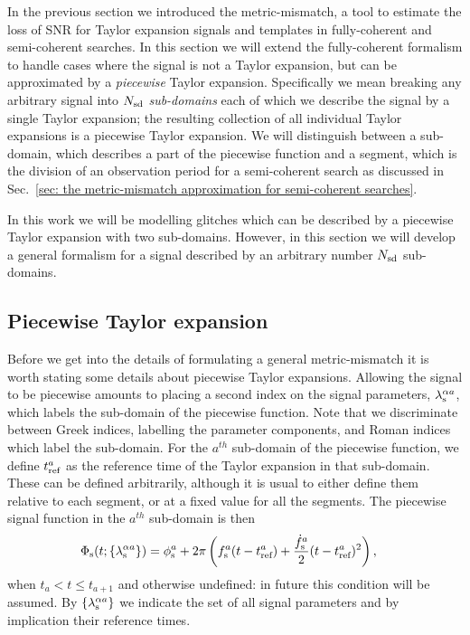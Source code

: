 \documentclass[../full_thesis/full_thesis.tex]{subfiles}
\begin{document}
In the previous section we introduced the metric-mismatch, a tool to estimate
the loss of SNR for Taylor expansion signals and templates in fully-coherent
and semi-coherent searches. In this section we will extend the fully-coherent
formalism to handle cases where the signal is not a Taylor expansion, but can
be approximated by a \emph{piecewise} Taylor expansion. Specifically we mean
breaking any arbitrary signal into $N_{\textrm{sd}}$ \emph{sub-domains} each of which we
describe the signal by a single Taylor expansion; the resulting collection of
all individual Taylor expansions is a piecewise Taylor expansion. We will
distinguish between a sub-domain, which describes a part of the piecewise
function and a segment, which is the division of an observation period for a
semi-coherent search as discussed in Sec.~\ref{sec: the metric-mismatch
approximation for semi-coherent searches}.

In this work we will be modelling glitches which can be described by a
piecewise Taylor expansion with two sub-domains. However, in this section we
will develop a general formalism for a signal described by an arbitrary number
$N_{\textrm{sd}}$ sub-domains.

\subsection{Piecewise Taylor expansion}
Before we get into the details of formulating a general metric-mismatch it is
worth stating some details about piecewise Taylor expansions.
Allowing the signal to be piecewise amounts to placing a second index on the
signal parameters, ${\lambda}_\textrm{s}^{\alpha a}$, which labels the sub-domain of the piecewise function.
Note that we discriminate between
Greek indices, labelling the parameter components, and Roman indices which
label the sub-domain.
For the $a^{th}$ sub-domain of the piecewise function, we define $t_{\textrm{ref}}^{a}$
as the reference time of the Taylor expansion in that sub-domain. These can
be defined arbitrarily, although it is usual to either define them
relative to each segment, or at a fixed value for all the segments.
The piecewise signal function in the $a^{th}$ sub-domain is then
\begin{align}
\Phi_{\textrm{s}}(t; \{{\lambda}_\textrm{s}^{\alpha a}\}) & = \phi_{\textrm{s}}^a + 2\pi \left(f_{\textrm{s}}^a (t - t_{\textrm{ref}}^a)
+ \frac{\dot{f}_{\textrm{s}}^a}{2}(t - t_{\textrm{ref}}^a)^{2} \right),
\label{eqn: piecewise Taylor lambda signal}
\end{align}
when $t_{a} < t \le t_{a+1}$ and otherwise undefined: in future this condition will
be assumed.  By $\{{\lambda}_\textrm{s}^{\alpha a}\}$ we indicate the set of all signal
parameters and by implication their reference times.
\end{document}
